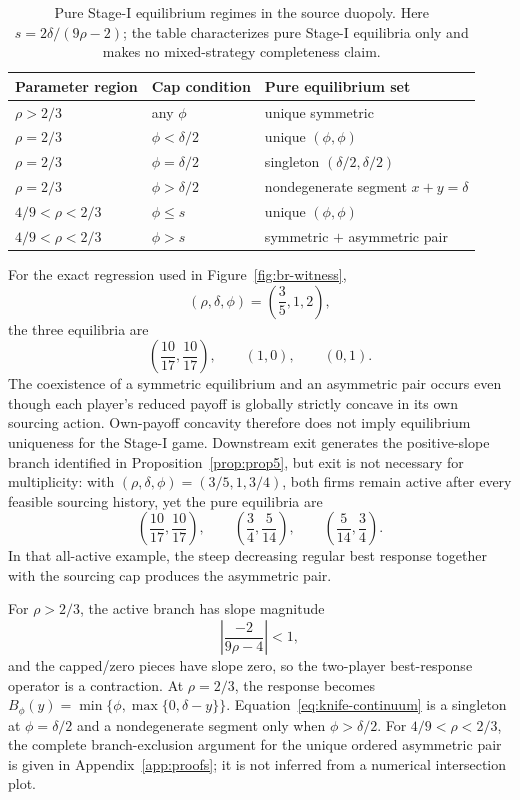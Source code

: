 \begin{table}[t]
\centering
\caption{Pure Stage-I equilibrium regimes in the source duopoly.  Here \(s=2\delta/(9\rho-2)\); the table characterizes pure Stage-I equilibria only and makes no mixed-strategy completeness claim.}
\label{tab:eq-regimes}
\begin{tabular}{@{}lll@{}}
\toprule
Parameter region & Cap condition & Pure equilibrium set\\
\midrule
\(\rho>2/3\) & any \(\phi\) & unique symmetric\\
\(\rho=2/3\) & \(\phi<\delta/2\) & unique \((\phi,\phi)\)\\
\(\rho=2/3\) & \(\phi=\delta/2\) & singleton \((\delta/2,\delta/2)\)\\
\(\rho=2/3\) & \(\phi>\delta/2\) & nondegenerate segment \(x+y=\delta\)\\
\(4/9<\rho<2/3\) & \(\phi\le s\) & unique \((\phi,\phi)\)\\
\(4/9<\rho<2/3\) & \(\phi>s\) & symmetric \(+\) asymmetric pair\\
\bottomrule
\end{tabular}
\end{table}

For the exact regression used in Figure~\ref{fig:br-witness},
\begin{equation}
(\rho,\delta,\phi)=\left(\frac35,1,2\right),
\label{eq:regression}
\end{equation}
the three equilibria are
\begin{equation}
\left(\frac{10}{17},\frac{10}{17}\right),
\qquad
(1,0),
\qquad
(0,1).
\label{eq:regression-eq}
\end{equation}
The coexistence of a symmetric equilibrium and an asymmetric pair occurs even though each player's reduced payoff is globally strictly concave in its own sourcing action.  Own-payoff concavity therefore does not imply equilibrium uniqueness for the Stage-I game.  Downstream exit generates the positive-slope branch identified in Proposition~\ref{prop:prop5}, but exit is not necessary for multiplicity: with \((\rho,\delta,\phi)=(3/5,1,3/4)\), both firms remain active after every feasible sourcing history, yet the pure equilibria are
\[
\left(\frac{10}{17},\frac{10}{17}\right),
\qquad
\left(\frac34,\frac5{14}\right),
\qquad
\left(\frac5{14},\frac34\right).
\]
In that all-active example, the steep decreasing regular best response together with the sourcing cap produces the asymmetric pair.

For \(\rho>2/3\), the active branch has slope magnitude
\[
\left|\frac{-2}{9\rho-4}\right|<1,
\]
and the capped/zero pieces have slope zero, so the two-player best-response operator is a contraction.  At \(\rho=2/3\), the response becomes \(B_\phi(y)=\min\{\phi,\max\{0,\delta-y\}\}\).  Equation~\eqref{eq:knife-continuum} is a singleton at \(\phi=\delta/2\) and a nondegenerate segment only when \(\phi>\delta/2\).  For \(4/9<\rho<2/3\), the complete branch-exclusion argument for the unique ordered asymmetric pair is given in Appendix~\ref{app:proofs}; it is not inferred from a numerical intersection plot.
